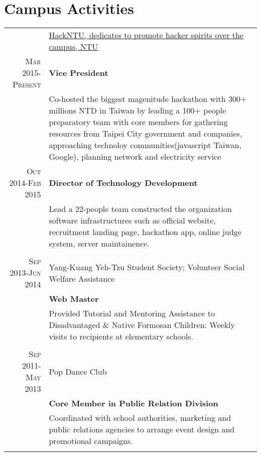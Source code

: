 \documentclass[a4paper,10pt]{article} %
\begin{document}
\section{Campus Activities}
\begin{tabular}{r|p{11cm}}

& \href{https://hackntu.org}{HackNTU, dedicates to promote hacker spirits over the campus, NTU}\\
\textsc{Mar 2015-Present}& \normalsize\textbf{Vice President}\\
&\footnotesize{Co-hosted the biggest magenitude hackathon with 300+ millions NTD in Taiwan by leading a 100+ people preparatory team with core members for gathering resources from Taipei City government and companies, approaching technoloy communities(javascript Taiwan, Google), planning network and electricity service}\\
\newline \newline

\textsc{Oct 2014-Feb 2015}& \normalsize\textbf{Director of Technology Development}\\
&\footnotesize{Lead a 22-people team constructed the organization software infrastructures such as official website, recruitment landing page, hackathon app, online judge system, server maintainence.}\\
\multicolumn{2}{c}{} \\

\textsc{Sep 2013-Jun 2014}& Yang-Kuang Yeh-Tzu Student Society; Volunteer Social Welfare Assistance \\
& \normalsize\textbf{Web Master}\\
& \footnotesize{Provided Tutorial and Mentoring Assistance to Disadvantaged \& Native Formosan Children: Weekly visits to recipients at elementary schools.}\\
\multicolumn{2}{c}{} \\

\textsc{Sep 2011-May 2013}& Pop Dance Club\\
&\normalsize\textbf{Core Member in Public Relation Division}\\
&\footnotesize{Coordinated with school authorities, marketing and public relations agencies to arrange event
design and promotional campaigns.}\\
\multicolumn{2}{c}{} \\

\end{tabular}
\end{document}
